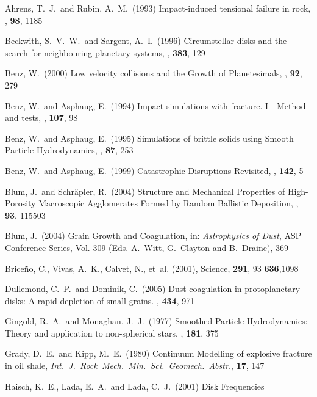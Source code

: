 \begin{literature}
\item Ahrens, T.~J.\ and Rubin, A.~M.\ (1993) Impact-induced tensional
failure in rock, \jgr, \textbf{98}, 1185
\item Beckwith, S.~V.~W.~and Sargent, A.~I.\ (1996) Circumstellar disks
and the search for neighbouring planetary systems, \nat, \textbf{383},
129
\item Benz, W.\ (2000) Low velocity collisions and the Growth of
Planetesimals, \ssr, \textbf{92}, 279
\item Benz, W.~and Asphaug, E.\ (1994) Impact simulations with fracture.
I - Method and tests, \ica, \textbf{107}, 98
\item Benz, W.~and Asphaug, E.\ (1995) Simulations of brittle solids
using Smooth Particle Hydrodynamics, \cpc, \textbf{87}, 253
\item Benz, W.~and Asphaug, E.\ (1999) Catastrophic Disruptions
Revisited, \ica, \textbf{142}, 5
\item Blum, J.\ and Schr\"apler, R.\ (2004) Structure
and Mechanical Properties of High-Porosity Macroscopic Agglomerates
Formed by Random Ballistic Deposition, \prl, \textbf{93}, 115503
\item Blum, J.\ (2004) Grain Growth and Coagulation, in: \textit 
{Astrophysics
of Dust}, ASP Conference Series, Vol. 309 (Eds. A.~Witt, G.~Clayton and
B.~Draine), 369
\item
{Brice{\~n}o}, C., {Vivas}, A.~K., {Calvet}, N., {et~al.} (2001),
  Science, {\bf 291}, 93
\textbf{636},1098
\item
Dullemond, C.~P.\ and Dominik, C.~(2005) Dust coagulation in
protoplanetary disks: A rapid depletion of small grains. \aap,
\textbf{434}, 971
\item Gingold, R.~A.~and Monaghan, J.~J.~(1977) Smoothed Particle
Hydrodynamics: Theory and application to non-spherical stars, \mn,
\textbf{181}, 375
\item Grady, D.~E.~and Kipp, M.~E.~(1980) Continuum Modelling of
explosive fracture in oil shale,
\textit{Int.~J.~Rock~Mech.\ Min.~Sci.~Geomech.~Abstr.}, \textbf{17}, 147
\item Haisch, K.~E., Lada, E.~A.~and Lada, C.~J.~(2001) Disk Frequencies

\end{literature}
